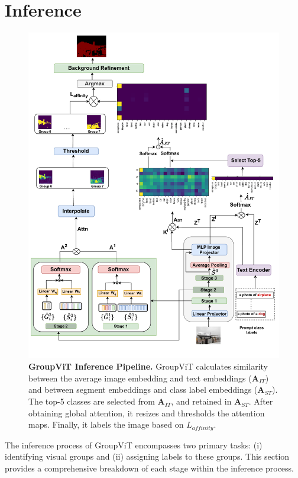 \section{Inference}
\label{sec:inf}
\begin{figure}
  \centering
  \includegraphics[width=1\textwidth, height=0.8\textheight]{Images/temp.drawio (4).pdf}
  \caption[\textbf{GroupViT: Inference Pipeline}]{\textbf{GroupViT Inference Pipeline. }GroupViT calculates similarity between the average image embedding and text embeddings ($\textbf{A}_{IT}$) and between segment embeddings and class label embeddings ($\textbf{A}_{ST}$). The top-5 classes are selected from $\textbf{A}_{IT}$, and retained in $\textbf{A}_{ST}$. After obtaining global attention, it resizes and thresholds the attention maps. Finally, it labels the image based on $L_{affinity}$.}
\label{fig:inf}
\end{figure}

The inference process of GroupViT encompasses two primary tasks: (i) identifying visual groups and (ii) assigning labels to these groups. This section provides a comprehensive breakdown of each stage within the inference process.

